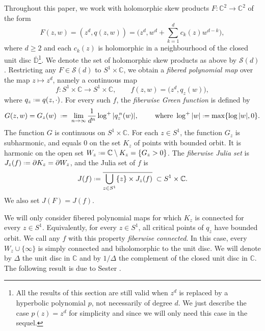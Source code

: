 \documentclass[11pt]{amsart}
\theoremstyle{plain}
\theoremstyle{definition}
\theoremstyle{remark}
\newcommand*{\defeq}{\mathrel{\vcenter{\baselineskip0.5ex \lineskiplimit0pt
			\hbox{\scriptsize.}\hbox{\scriptsize.}}}%
	=}
\begin{document}
Throughout this paper, we work with holomorphic skew products 
$F\colon\mathbb C^2 \to \mathbb C^2 $
of the form
\begin{equation}\label{eq:F-skew}
F(z,w)=(z^d,q(z,w)) = \Big(z^d, w^d + \sum_{k=1}^d c_k(z)w^{d-k}\Big),
\end{equation}
where $d\geq 2$
and each $c_k(z)$ is holomorphic in a neighbourhood of the closed unit disc
$\overline{\mathbb D}$\footnote{All the results of this section are still valid when $z^d$ is replaced by a hyperbolic polynomial $p$, not necessarily of degree $d$. We 
just describe the case $p(z)=z^d$ for simplicity and since we will only need this case in the sequel.}.
We denote the set of holomorphic skew products as above by $\mathcal S(d)$.
Restricting any $F\in \mathcal S(d)$
 to $S^1\times\mathbb C$,
 we obtain a \emph{fibered polynomial map} over
 the map
 $z\mapsto z^d$, namely
 a continuous map
\[
f\colon S^1\times\mathbb C\longrightarrow S^1\times\mathbb C,
\qquad
f(z,w) = \bigl(z^d, q_z(w)\bigr),
\]
where $q_z\defeq q(z,\cdot)$.
For every such $f$,
 the \emph{fiberwise Green function} is defined by
\[
G(z,w) = G_z(w)
\;\defeq\;
\lim_{n\to\infty}\frac{1}{d^n}\log^+|q_z^{\,n}(w)|,
\qquad
\mbox{ where }
\log^+|w|\defeq\max\{\log|w|,0\}.
\]
The function $G$ is continuous on $S^1\times\mathbb C$. For each $z\in S^1$,
 the function $G_z$ is subharmonic, and equals $0$ on the set $K_z$ of points with bounded orbit. It 
is harmonic on the
open set $W_z \defeq \mathbb C \setminus K_z = \{G_z>0\}$.
The \emph{fiberwise Julia set} is $J_z(f)\defeq\partial K_z = \partial W_z$, 
and the Julia set of $f$ is
\[
J(f) \defeq \overline{\bigcup_{z\in S^1} \{z\}\times J_z(f)} \;\subset S^1\times\mathbb C.
\]
We also set $J(F)= J(f)$.

\medskip

We will only consider
fibered polynomial maps for which $K_z$ is connected for every $z\in S^1$.
 Equivalently, 
for every $z\in S^1$,
 all critical points of $q_z$ have bounded orbit.
 We call any $f$ with this property \emph{fiberwise
connected}.
In this case, every $W_z\cup \{\infty\}$ is simply connected and 
  biholomorphic to the unit disc.
   We will denote by $\Delta$
the unit disc in $\mathbb C$ and by $1/\Delta$ the complement of the closed unit disc in $\mathbb C$.
The following result is due to Sester \cite{Sester99}.
\end{document}
